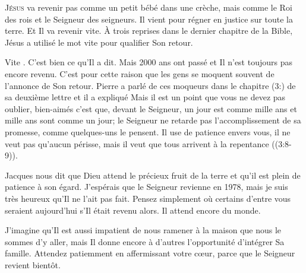 \jrnlmonth




\lettrine{J}{ésus} va revenir \ocadr pas comme un petit bébé dans une crèche,
 mais comme le Roi des rois et le Seigneur des seigneurs.
 Il vient pour régner en justice sur toute la terre. Et Il va revenir vite.
 À trois reprises dans le dernier chapitre de la Bible, Jésus a utilisé le mot
 \Og vite \Fg{} pour qualifier Son retour.

\Og Vite \Fg{}. C'est bien ce qu'Il a dit.
 Mais 2000 ans ont passé et Il n'est toujours pas encore revenu.
 C'est pour cette raison que les gens se moquent souvent de l'annonce
 de Son retour. Pierre a parlé de ces moqueurs dans le chapitre
 (3:)
 de sa deuxième lettre et il a expliqué\frcolon{}
 \Og Mais il est un point que vous ne devez pas oublier, bien-aimés\frcolon{}
 c'est que, devant le Seigneur, un jour est comme mille ans et mille ans
 sont comme un jour; le Seigneur ne retarde pas l'accomplissement
 de sa promesse, comme quelques-uns le pensent.
 Il use de patience envers vous, il ne veut pas qu'aucun périsse,
 mais il veut que tous arrivent à la repentance \Fg{}
 ((3:8-9)).


Jacques nous dit que Dieu attend le précieux fruit de la terre
 et qu'il est plein de patience à son égard.
 J'espérais que le Seigneur revienne en 1978, mais je suis très heureux
 qu'Il ne l'ait pas fait. Pensez simplement où certains d'entre vous seraient
 aujourd'hui s'Il était revenu alors. Il attend encore du monde.

J'imagine qu'Il est aussi impatient de nous ramener à la maison
 que nous le sommes d'y aller, mais Il donne encore à d'autres l'opportunité
 d'intégrer Sa famille. Attendez patiemment en affermissant votre c\oe{}ur,
 parce que le Seigneur revient bientôt.

\dvrule





